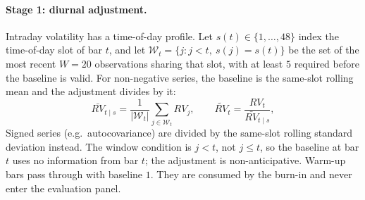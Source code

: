 \paragraph{Stage 1: diurnal adjustment.}
Intraday volatility has a time-of-day profile. Let
$s(t) \in \{1,\dots,48\}$ index the time-of-day slot of bar $t$, and let
$\mathcal{W}_t = \{j : j < t,\ s(j)=s(t)\}$ be the set of the most recent
$W = 20$ observations sharing that slot, with at least $5$ required before
the baseline is valid. For non-negative series, the baseline is the
same-slot rolling mean and the adjustment divides by it:
\begin{equation}
    \bar{RV}_{t\mid s} = \frac{1}{|\mathcal{W}_t|}\sum_{j \in \mathcal{W}_t} RV_j,
    \qquad
    \widetilde{RV}_t = \frac{RV_t}{\bar{RV}_{t\mid s}},
    \label{eq:dp_diurnal}
\end{equation}
Signed series (e.g.\ autocovariance) are divided by the same-slot rolling
standard deviation instead. The window condition is $j < t$, not
$j \le t$, so the baseline at bar $t$ uses no information from bar $t$;
the adjustment is non-anticipative. Warm-up bars pass through with
baseline $1$. They are consumed by the burn-in and never enter the
evaluation panel.

